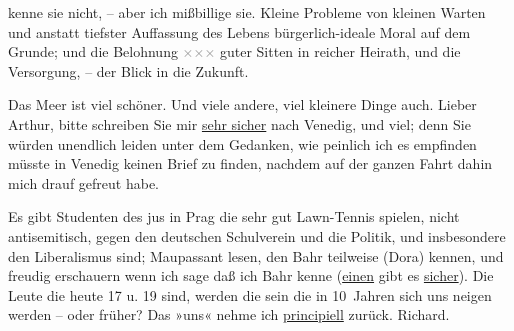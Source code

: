                kenne sie nicht, – aber ich mißbillige sie. Kleine Probleme von kleinen Warten und anstatt
               tiefster Auffassung des {\pb}Lebens
               bürgerlich-ideale Moral auf dem Grunde; und die Belohnung \textcolor{gray}{×}\-\textcolor{gray}{×}\-\textcolor{gray}{×} guter Sitten in reicher Heirath, und die
               Versorgung, – der Blick in die Zukunft.\pend
           
\pstart
           Das Meer ist viel schöner. Und viele andere, viel kleinere Dinge auch. Lieber Arthur,
               bitte schreiben Sie mir \uline{sehr sicher} nach Venedig, und viel; denn Sie würden unendlich
               leiden unter dem Gedanken, wie peinlich ich es empfinden müsste in Venedig keinen Brief {\pb}zu finden, nachdem auf der ganzen
               Fahrt dahin mich drauf gefreut habe.\pend
           
\pstart
           Es gibt Studenten des jus in Prag die sehr gut
               Lawn-Tennis spielen, nicht antisemitisch, gegen den deutschen Schulverein und die Politik, und insbesondere den Liberalismus
               sind; Maupassant lesen, den Bahr teilweise (Dora) kennen, und freudig erschauern wenn ich sage daß ich Bahr kenne (\uline{einen} gibt es \uline{sicher}). Die Leute die heute
               17 u. 19 sind, werden die sein die in 10 Jahren sich uns neigen werden – oder früher?
               Das »uns« nehme ich \uline{principiell} zurück.
                  \spacefill\mbox{Richard.}\pend
           \endnumbering{}  
      